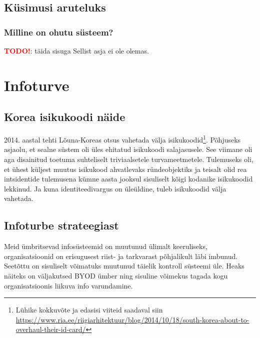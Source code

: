 \documentclass{tufte-book}
\newcommand{\TODO}{\textcolor{red}{\bf TODO!}\xspace}
\begin{document}
\section{Küsimusi aruteluks}
\subsection{Milline on ohutu süsteem?}
\TODO: täida sisuga
Sellist asja ei ole olemas. 


\chapter{Infoturve}

\section{Korea isikukoodi näide}
2014. aastal tehti Lõuna-Koreas otsus vahetada välja isikukoodid\footnote{Lühike kokkuvõte ja edasisi viiteid saadaval siin \url{https://www.ria.ee/riigiarhitektuur/blog/2014/10/18/south-korea-about-to-overhaul-their-id-card/}}. Põhjuseks asjaolu, et sealne süstem oli üles ehitatud isikukoodi salajasusele. See viimane oli aga disainitud toetuma suhteliselt triviaalsetele turvameetmetele. Tulemuseks oli, et ühest küljest muutus isikukood ahvatlevaks ründeobjektiks ja teisalt olid rea intsidentide tulemusena kümne aasta jooksul sisuliselt kõigi kodanike isikukoodid lekkinud. Ja kuna identiteedivargus on üleüldine, tuleb isikukoodid välja vahetada.

\section{Infoturbe strateegiast}
Meid ümbritsevad infosüsteemid on muutunud ülimalt keeruliseks, organisatsioonid on erisugusest riist- ja tarkvarast põhjalikult läbi imbunud. Seetõttu on sisuliselt võimatuks muutunud täielik kontroll süsteemi üle. Heaks näiteks on väljakutsed BYOD ümber ning sisuline võimekus tagada kogu organisatsioonis liikuva info varundamine. 
\end{document}

